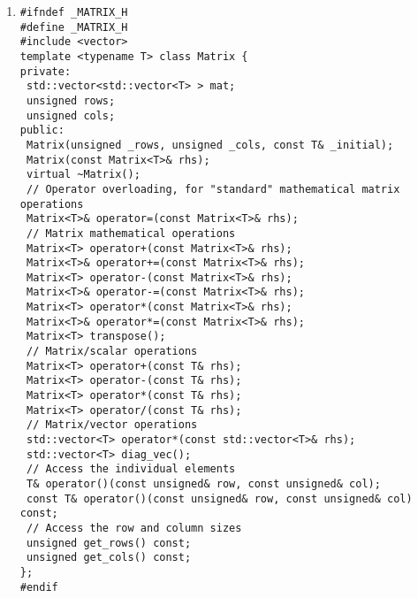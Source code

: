 \documentclass[10pt]{article}
\begin{document}
\begin{enumerate}
\begin{lstlisting}
\end{lstlisting}

\item %
\begin{lstlisting}
#ifndef _MATRIX_H
#define _MATRIX_H
#include <vector>
template <typename T> class Matrix {
private:
 std::vector<std::vector<T> > mat;
 unsigned rows;
 unsigned cols;
public:
 Matrix(unsigned _rows, unsigned _cols, const T& _initial);
 Matrix(const Matrix<T>& rhs);
 virtual ~Matrix();
 // Operator overloading, for "standard" mathematical matrix operations                                                                                                                                                         
 Matrix<T>& operator=(const Matrix<T>& rhs);
 // Matrix mathematical operations                                                                                                                                                                                              
 Matrix<T> operator+(const Matrix<T>& rhs);
 Matrix<T>& operator+=(const Matrix<T>& rhs);
 Matrix<T> operator-(const Matrix<T>& rhs);
 Matrix<T>& operator-=(const Matrix<T>& rhs);
 Matrix<T> operator*(const Matrix<T>& rhs);
 Matrix<T>& operator*=(const Matrix<T>& rhs);
 Matrix<T> transpose();
 // Matrix/scalar operations                                                                                                                                                                                                    
 Matrix<T> operator+(const T& rhs);
 Matrix<T> operator-(const T& rhs);
 Matrix<T> operator*(const T& rhs);
 Matrix<T> operator/(const T& rhs);
 // Matrix/vector operations                                                                                                                                                                                                     
 std::vector<T> operator*(const std::vector<T>& rhs);
 std::vector<T> diag_vec();
 // Access the individual elements                                                                                                                                                                                               
 T& operator()(const unsigned& row, const unsigned& col);
 const T& operator()(const unsigned& row, const unsigned& col) const;
 // Access the row and column sizes                                                                                                                                                                                             
 unsigned get_rows() const;
 unsigned get_cols() const;
};
#endif
\end{lstlisting}


\end{enumerate}
\end{document}
